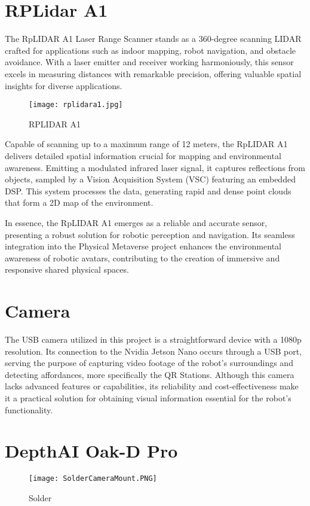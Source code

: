 \documentclass{Configuration_Files/PoliMi3i_thesis}
\begin{document}
\section{RPLidar A1}
The RpLIDAR A1 Laser Range Scanner stands as a 360-degree scanning LIDAR crafted for applications such as indoor mapping, robot navigation, and obstacle avoidance. With a laser emitter and receiver working harmoniously, this sensor excels in measuring distances with remarkable precision, offering valuable spatial insights for diverse applications.
\begin{figure}[h]
    \centering
    \texttt{[image: rplidara1.jpg]}
    \caption{RPLIDAR A1}
\end{figure}
Capable of scanning up to a maximum range of 12 meters, the RpLIDAR A1 delivers detailed spatial information crucial for mapping and environmental awareness. Emitting a modulated infrared laser signal, it captures reflections from objects, sampled by a Vision Acquisition System (VSC) featuring an embedded DSP. This system processes the data, generating rapid and dense point clouds that form a 2D map of the environment.

In essence, the RpLIDAR A1 emerges as a reliable and accurate sensor, presenting a robust solution for robotic perception and navigation. Its seamless integration into the Physical Metaverse project enhances the environmental awareness of robotic avatars, contributing to the creation of immersive and responsive shared physical spaces.

\section{Camera}

The USB camera utilized in this project is a straightforward device with a 1080p resolution. Its connection to the Nvidia Jetson Nano occurs through a USB port, serving the purpose of capturing video footage of the robot's surroundings and detecting affordances, more specifically the QR Stations. Although this camera lacks advanced features or capabilities, its reliability and cost-effectiveness make it a practical solution for obtaining visual information essential for the robot's functionality.

\section{DepthAI Oak-D Pro}
\begin{figure}[h]
    \centering
    \texttt{[image: SolderCameraMount.PNG]}
    \caption{Solder}
\end{figure}
\end{document}
